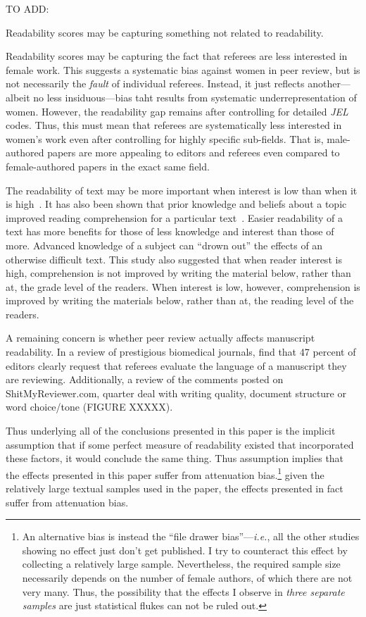 TO ADD:

Readability scores may be capturing something not related to readability.

Readability scores may be capturing the fact that referees are less interested in female work. This suggests a systematic bias against women in peer review, but is not necessarily the \emph{fault} of individual referees. Instead, it just reflects another---albeit no less insiduous---bias taht results from systematic underrepresentation of women. However, the readability gap remains after controlling for detailed \emph{JEL} codes. Thus, this must mean that referees are systematically less interested in women's work even after controlling for highly specific sub-fields. That is, male-authored papers are more appealing to editors and referees even compared to female-authored papers in the exact same field.

The readability of text may be more important when interest is low than when it is high~\citep{Klare1976,Fass1978}. It has also been shown that prior knowledge and beliefs about a topic improved reading comprehension for a particular text~\citep{Woern1977,Spilich1979,Chiesi1979}. Easier readability of a text has more benefits for those of less knowledge and interest than those of more. Advanced knowledge of a subject can ``drown out'' the effects of an otherwise difficult text. This study also suggested that when reader interest is high, comprehension is not improved by writing the material below, rather than at, the grade level of the readers. When interest is low, however, comprehension is improved by writing the materials below, rather than at, the reading level of the readers.

A remaining concern is whether peer review actually affects manuscript readability. In a review of prestigious biomedical journals,  \citet{Boutron2016} find that 47 percent of editors clearly request that referees evaluate the language of a manuscript they are reviewing. Additionally, a review of the comments posted on ShitMyReviewer.com, quarter deal with writing quality, document structure or word choice\slash tone (FIGURE XXXXX).

Thus underlying all of the conclusions presented in this paper is the implicit assumption that if some perfect measure of readability existed that incorporated these factors, it would conclude the same thing. Thus assumption implies that the effects presented in this paper suffer from attenuation bias.\footnote{An alternative bias is instead the ``file drawer bias''---\emph{i.e.}, all the other studies showing no effect just don't get published. I try to counteract this effect by collecting a relatively large sample. Nevertheless, the required sample size necessarily depends on the number of female authors, of which there are not very many. Thus, the possibility that the effects I observe in \emph{three separate samples} are just statistical flukes can not be ruled out.} given the relatively large textual samples used in the paper, the effects presented in fact suffer from attenuation bias.

